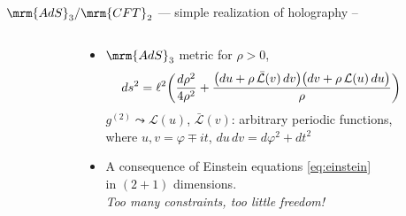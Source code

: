 \documentclass[aspectratio=169,10pt
	,noamsthm
]{beamer}
\begin{document}
\begin{frame}{$\mrm{AdS}_3/\mrm{CFT}_2$ --- simple realization of holography}{%
	\textcite{Aharony:1999ti} -- 
}
\begin{columns}
\begin{column}{.4\textwidth}
\figAdsCft
\end{column}
\begin{column}{.6\textwidth}
	\begin{itemize}
	\item $\mrm{AdS}_3$ metric for $\rho > 0$, \\
	\textcite{Banados:1998gg}
	\begin{equation}
	\hspace{-2.5em}
		ds^2 = \ell^2 \bigg( \frac{d\rho^2}{4 \rho^2} + \frac{ \big( du + \rho \, \mathcal {\bar L}(v)\, dv \big) \big( dv + \rho \, \mathcal L(u)\, du \big) }{\rho} \bigg)\ \label{banados}
	\end{equation}
	$g^{(2)} \leadsto \mathcal L(u)$, $\bar{\mathcal L}(v)$: arbitrary periodic functions,\\
	where $u,v = \varphi \mp it$, $du\,dv = d\varphi^2 + dt^2$
	
\pause
	\item A consequence of Einstein equations \eqref{eq:einstein} \\
	in $(2+1)$ dimensions.\\
	\textit{Too many constraints, too little freedom!}
	\end{itemize}
\end{column}
\end{columns}
\end{frame}
\end{document}

